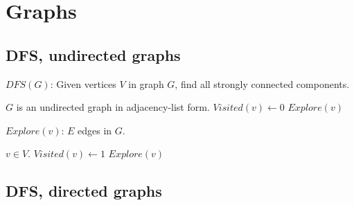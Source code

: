 \documentclass{article}
\begin{document}
	
\section{Graphs}
\subsection{DFS, undirected graphs}

\begin{algorithm}
\caption{$DFS(G)$: Given vertices $V$ in graph $G$, find all strongly connected components.}
\begin{algorithmic}[1]
\REQUIRE $G$ is an undirected graph in adjacency-list form.
\STATE $Visited(v) \gets 0$
\ENDFOR
{}
	\STATE $Explore(v)$
\ENDIF
\ENDFOR
\end{algorithmic}
\end{algorithm}

\begin{algorithm}
\caption{$Explore(v)$: $E$ edges in $G$.}
\begin{algorithmic}[1]
\REQUIRE $v \in V$.
\STATE $Visited(v) \gets 1$
	\STATE $Explore(v)$
\ENDIF
\ENDFOR
\end{algorithmic}
\end{algorithm}

\subsection{DFS, directed graphs}
\end{document}

